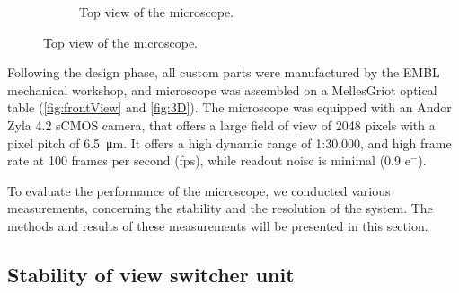 \begin{figure}
\begin{subfigure}[t]{1\textwidth}
      \caption{Top view of the microscope.}
    \end{subfigure}
    \label{fig:frontView}
  \end{figure}


  Following the design phase, all custom parts were manufactured by the EMBL mechanical workshop, and microscope was assembled on a MellesGriot optical table (\autoref{fig:frontView} and \autoref{fig:3D}). The microscope was equipped with an Andor Zyla 4.2 sCMOS camera, that offers a large field of view of 2048 pixels with a pixel pitch of \SI{6.5}{\micro m}. It offers a high dynamic range of 1:30,000, and high frame rate at 100 frames per second (fps), while readout noise is minimal (0.9 e$^-$).
  
  To evaluate the performance of the microscope, we conducted various measurements, concerning the stability and the resolution of the system. The methods and results of these measurements will be presented in this section.


  \subsection{Stability of view switcher unit}
    \label{sec:mirrorStability}

